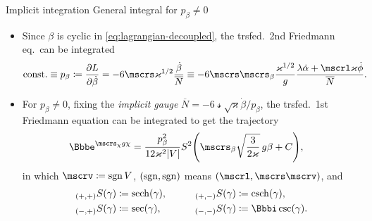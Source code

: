 \documentclass[9pt]{beamer}
\begin{document}
\begin{frame}%
{Implicit integration}%
{General integral for $p_\beta \neq 0$}
\begin{itemize}
\item Since $\beta$ is cyclic in \cref{eq:lagrangian-decoupled},
the trsfed.\ 2nd Friedmann eq.\ can be integrated%
\begin{align}
\text{const.} \equiv p_\beta \coloneqq \frpa{L}{\dot{\beta}} &=
-6\mscrs\varkappa^{1/2}\frac{\dot{\beta}}{\overline{N}}
\equiv
-6\mscrs\mscrs_\beta\frac{\varkappa^{1/2}}{g}
\frac{\lambda\dot{\alpha}+\mscrl\varkappa\dot{\phi}}{\overline{N}}.
\end{align}

\item For $p_\beta \neq 0$, fixing the \emph{implicit gauge}
$\overline{N} = -6\mscrs\sqrt{\varkappa}\dot{\beta}/p_\beta$, the trsfed.\
1st Friedmann equation \alert{can be integrated to get the trajectory}
\begin{align}
\ee^{\mscrs_\chi g\chi} &=
\frac{p_\beta^2}{12\varkappa^2\vbr{V}}
\rfun{S^2}{\mscrs_\beta \sqrt{\frac{3}{2\varkappa}}\,g \beta+C},
\end{align}
in which $\mscrv \coloneqq \sgn V$, ${\left(\mathrm{sgn},\mathrm{sgn}\right)}$ means 
$\rbr{\mscrl,\mscrs\mscrv}$, and
\begin{align}
\begin{aligned}
\rfun{{}_{\rbr{+,+}}S}{\gamma} &\coloneqq \rfun{\sech}{\gamma},
&\qquad
\rfun{{}_{\rbr{+,-}}S}{\gamma} &\coloneqq \rfun{\csch}{\gamma},\\
\rfun{{}_{\rbr{-,+}}S}{\gamma} &\coloneqq \rfun{\sec}{\gamma},
&\qquad
\rfun{{}_{\rbr{-,-}}S}{\gamma} &\coloneqq \rfun{\ii\csc}{\gamma}.\\
\end{aligned}
\end{align}
\end{itemize}
\end{frame}
\end{document}
